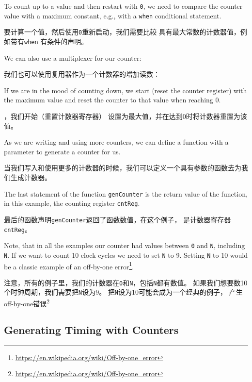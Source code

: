 \documentclass[%
    10pt,
    headinclude, footexclude,
    openright, %
    notitlepage,
    cleardoubleempty,
    headsepline,
    pointlessnumbers,
    bibtotoc, idxtotoc,
    ]{scrbook}
\newcommand{\code}[1]{{\small{\texttt{#1}}}}
\newcommand{\myref}[2]{\href{#1}{#2}}
\renewcommand{\myref}[2]{{#2}{\footnote{\url{#1}}}}
\begin{document}
To count up to a value and then restart with \code{0}, we need to compare
the counter value with a maximum constant, e.g., with a \code{when}
conditional statement.

要计算一个值，然后使用\code{0}重新启动，我们需要比较
具有最大常数的计数器值，例如带有\code{when}
有条件的声明。


\noindent We can also use a multiplexer for our counter:

\noindent 我们也可以使用复用器作为一个计数器的增加读数：


\noindent If we are in the mood of counting down, we start (reset the counter register)
with the maximum value and reset the counter to that value when reaching 0.

，我们开始（重置计数器寄存器）
设置为最大值，并在达到0时将计数器重置为该值。


\noindent As we are writing and using more counters, we can
define a function with a parameter to generate a counter for us.

\noindent 当我们写入和使用更多的计数器的时候，我们可以定义一个具有参数的函数去为我们生成计数器。


\noindent The last statement of the function \code{genCounter} is the return
value of the function, in this example, the counting register \code{cntReg}.

\noindent 最后的函数声明\code{genCounter}返回了函数数值，在这个例子，
是计数器寄存器\code{cntReg}。

Note, that in all the examples our counter had values between \code{0} and
\code{N}, including \code{N}. If we want to count 10 clock cycles we need
to set \code{N} to 9. Setting \code{N} to 10 would be a classic example of an
\myref{https://en.wikipedia.org/wiki/Off-by-one_error}{off-by-one error}.

注意，所有的例子里，我们的计数器在\code{0}和\code{N}，包括\code{N}都有数值。
如果我们想要数10个时钟周期，我们需要把\code{N}设为9。
把\code{N}设为10可能会成为一个经典的例子，
产生\myref{https://en.wikipedia.org/wiki/Off-by-one_error}{off-by-one错误}

\subsection{Generating Timing with Counters}
\end{document}
